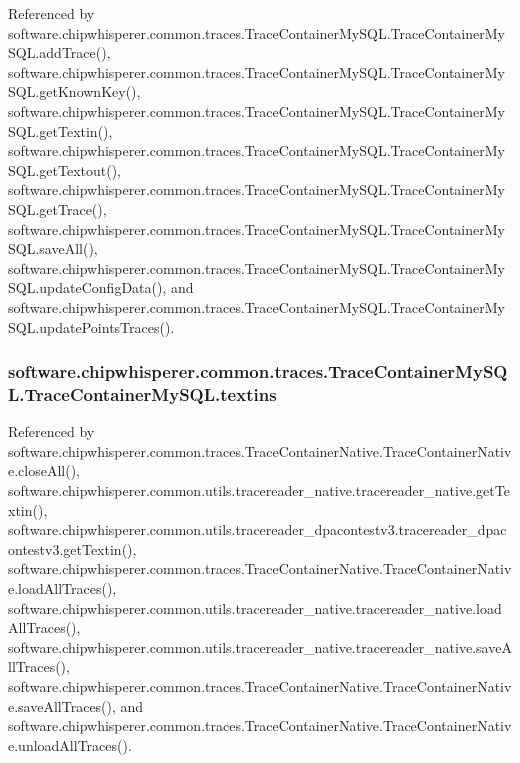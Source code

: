 Referenced by software.\+chipwhisperer.\+common.\+traces.\+Trace\+Container\+My\+S\+Q\+L.\+Trace\+Container\+My\+S\+Q\+L.\+add\+Trace(), software.\+chipwhisperer.\+common.\+traces.\+Trace\+Container\+My\+S\+Q\+L.\+Trace\+Container\+My\+S\+Q\+L.\+get\+Known\+Key(), software.\+chipwhisperer.\+common.\+traces.\+Trace\+Container\+My\+S\+Q\+L.\+Trace\+Container\+My\+S\+Q\+L.\+get\+Textin(), software.\+chipwhisperer.\+common.\+traces.\+Trace\+Container\+My\+S\+Q\+L.\+Trace\+Container\+My\+S\+Q\+L.\+get\+Textout(), software.\+chipwhisperer.\+common.\+traces.\+Trace\+Container\+My\+S\+Q\+L.\+Trace\+Container\+My\+S\+Q\+L.\+get\+Trace(), software.\+chipwhisperer.\+common.\+traces.\+Trace\+Container\+My\+S\+Q\+L.\+Trace\+Container\+My\+S\+Q\+L.\+save\+All(), software.\+chipwhisperer.\+common.\+traces.\+Trace\+Container\+My\+S\+Q\+L.\+Trace\+Container\+My\+S\+Q\+L.\+update\+Config\+Data(), and software.\+chipwhisperer.\+common.\+traces.\+Trace\+Container\+My\+S\+Q\+L.\+Trace\+Container\+My\+S\+Q\+L.\+update\+Points\+Traces().

\hypertarget{classsoftware_1_1chipwhisperer_1_1common_1_1traces_1_1TraceContainerMySQL_1_1TraceContainerMySQL_a642c110ff74f04b77eb6572d40437f84}{}
\subsubsection[{textins}]{\setlength{\rightskip}{0pt plus 5cm}software.\+chipwhisperer.\+common.\+traces.\+Trace\+Container\+My\+S\+Q\+L.\+Trace\+Container\+My\+S\+Q\+L.\+textins}\label{classsoftware_1_1chipwhisperer_1_1common_1_1traces_1_1TraceContainerMySQL_1_1TraceContainerMySQL_a642c110ff74f04b77eb6572d40437f84}


Referenced by software.\+chipwhisperer.\+common.\+traces.\+Trace\+Container\+Native.\+Trace\+Container\+Native.\+close\+All(), software.\+chipwhisperer.\+common.\+utils.\+tracereader\+\_\+native.\+tracereader\+\_\+native.\+get\+Textin(), software.\+chipwhisperer.\+common.\+utils.\+tracereader\+\_\+dpacontestv3.\+tracereader\+\_\+dpacontestv3.\+get\+Textin(), software.\+chipwhisperer.\+common.\+traces.\+Trace\+Container\+Native.\+Trace\+Container\+Native.\+load\+All\+Traces(), software.\+chipwhisperer.\+common.\+utils.\+tracereader\+\_\+native.\+tracereader\+\_\+native.\+load\+All\+Traces(), software.\+chipwhisperer.\+common.\+utils.\+tracereader\+\_\+native.\+tracereader\+\_\+native.\+save\+All\+Traces(), software.\+chipwhisperer.\+common.\+traces.\+Trace\+Container\+Native.\+Trace\+Container\+Native.\+save\+All\+Traces(), and software.\+chipwhisperer.\+common.\+traces.\+Trace\+Container\+Native.\+Trace\+Container\+Native.\+unload\+All\+Traces().

